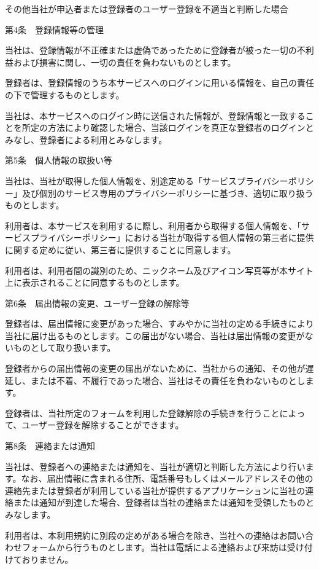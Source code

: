         その他当社が申込者または登録者のユーザー登録を不適当と判断した場合

第4条　登録情報等の管理

    当社は、登録情報が不正確または虚偽であったために登録者が被った一切の不利益および損害に関し、一切の責任を負わないものとします。

    登録者は、登録情報のうち本サービスへのログインに用いる情報を、自己の責任の下で管理するものとします。

    当社は、本サービスへのログイン時に送信された情報が、登録情報と一致することを所定の方法により確認した場合、当該ログインを真正な登録者のログインとみなし、登録者による利用とみなします。

第5条　個人情報の取扱い等

    当社は、当社が取得した個人情報を、別途定める「サービスプライバシーポリシー」及び個別のサービス専用のプライバシーポリシーに基づき、適切に取り扱うものとします。

    利用者は、本サービスを利用するに際し、利用者から取得する個人情報を、「サービスプライバシーポリシー」における当社が取得する個人情報の第三者に提供に関する定めに従い、第三者に提供することに同意します。

    利用者は、利用者間の識別のため、ニックネーム及びアイコン写真等が本サイト上に表示されることに同意するものとします。

第6条　届出情報の変更、ユーザー登録の解除等

    登録者は、届出情報に変更があった場合、すみやかに当社の定める手続きにより当社に届け出るものとします。この届出がない場合、当社は届出情報の変更がないものとして取り扱います。

    登録者からの届出情報の変更の届出がないために、当社からの通知、その他が遅延し、または不着、不履行であった場合、当社はその責任を負わないものとします。

    登録者は、当社所定のフォームを利用した登録解除の手続きを行うことによって、ユーザー登録を解除することができます。

第8条　連絡または通知

    当社は、登録者への連絡または通知を、当社が適切と判断した方法により行います。なお、届出情報に含まれる住所、電話番号もしくはメールアドレスその他の連絡先または登録者が利用している当社が提供するアプリケーションに当社の連絡または通知が到達した場合、登録者は当社の連絡または通知を受領したものとみなします。

    利用者は、本利用規約に別段の定めがある場合を除き、当社への連絡はお問い合わせフォームから行うものとします。当社は電話による連絡および来訪は受け付けておりません。

